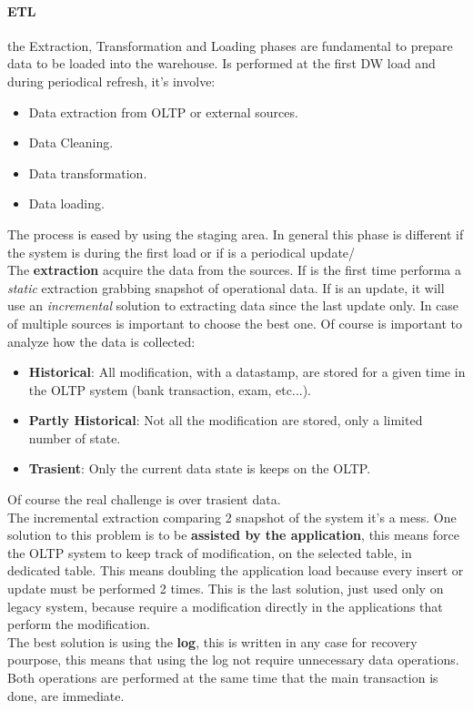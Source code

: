 \documentclass[12pt]{article}
\begin{document}
\paragraph{ETL} the Extraction, Transformation and Loading phases are fundamental to prepare data to be loaded into the warehouse. Is performed at the first DW load and during periodical refresh, it's involve:
\begin{itemize}
  \item Data extraction from OLTP or external sources.
  \item Data Cleaning.
  \item Data transformation.
  \item Data loading.
\end{itemize}
The process is eased by using the staging area. In general this phase is different if the system is during the first load or if is a periodical update/\\
The \textbf{extraction} acquire the data from the sources. If is the first time performa a \textit{static} extraction grabbing snapshot of operational data. If is an update, it will use an \textit{incremental} solution to extracting data since the last update only. In case of multiple sources is important to choose the best one. Of course is important to analyze how the data is collected:
\begin{itemize}
  \item \textbf{Historical}: All modification, with a datastamp, are stored for a given time in the OLTP system (bank transaction, exam, etc...).
  \item \textbf{Partly Historical}: Not all the modification are stored, only a limited number of state.
  \item \textbf{Trasient}: Only the current data state is keeps on the OLTP.
\end{itemize}
Of course the real challenge is over trasient data.\\
The incremental extraction comparing 2 snapshot of the system it's a mess. One solution to this problem is to be \textbf{assisted by the application}, this means force the OLTP system to keep track of modification, on the selected table, in dedicated table. This means doubling the application load because every insert or update must be performed 2 times. This is the last solution, just used only on legacy system, because require a modification directly in the applications that perform the modification.\\
The best solution is using the \textbf{log}, this is written in any case for recovery pourpose, this means that using the log not require unnecessary data operations. Both operations are performed at the same time that the main transaction is done, are immediate.\\
\end{document}
